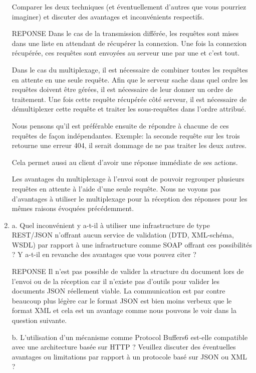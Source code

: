 \documentclass[a4paper]{article}
\begin{document}
\begin{enumerate}
    Comparer les deux techniques (et éventuellement d'autres que vous pourriez imaginer) et discuter des avantages et inconvénients respectifs.
    
    REPONSE
    Dans le cas de la transmission différée, les requêtes sont mises dans une liste en attendant de récupérer la connexion. Une fois la connexion récupérée, ces requêtes sont envoyées au serveur une par une et c'est tout.
    
    Dans le cas du multiplexage, il est nécessaire de combiner toutes les requêtes en attente en une seule requête. Afin que le serveur sache dans quel ordre les requêtes doivent être gérées, il est nécessaire de leur donner un ordre de traitement. Une fois cette requête récupérée côté serveur, il est nécessaire de démultiplexer cette requête et traiter les sous-requêtes dans l'ordre attribué.
    
    Nous pensons qu'il est préférable ensuite de répondre à chacune de ces requêtes de façon indépendantes. Exemple: la seconde requête sur les trois retourne une erreur 404, il serait dommage de ne pas traiter les deux autres.
    
    Cela permet aussi au client d'avoir une réponse immédiate de ses actions.
    
    Les avantages du multiplexage à l'envoi sont de pouvoir regrouper plusieurs requêtes en attente à l'aide d'une seule requête. Nous ne voyons pas d'avantages à utiliser le multiplexage pour la réception des réponses pour les mêmes raisons évoquées précédemment.
    
    \item a. Quel inconvénient y a-t-il à utiliser une infrastructure de type REST/JSON n'offrant aucun
    service de validation (DTD, XML-schéma, WSDL) par rapport à une infrastructure comme SOAP
    offrant ces possibilités ? Y a-t-il en revanche des avantages que vous pouvez citer ?
    
    REPONSE
    Il n'est pas possible de valider la structure du document lors de l'envoi ou de la réception car il n'existe pas d'outils pour valider les documents JSON réellement viable. La communication est par contre beaucoup plus légère car le format JSON est bien moins verbeux que le format XML et cela est un avantage comme nous pouvons le voir dans la question suivante.
    
    b. L’utilisation d’un mécanisme comme Protocol Buffers6 est-elle compatible avec une
    architecture basée sur HTTP ? Veuillez discuter des éventuelles avantages ou limitations par
    rapport à un protocole basé sur JSON ou XML ?
    

\end{enumerate}
\end{document}
